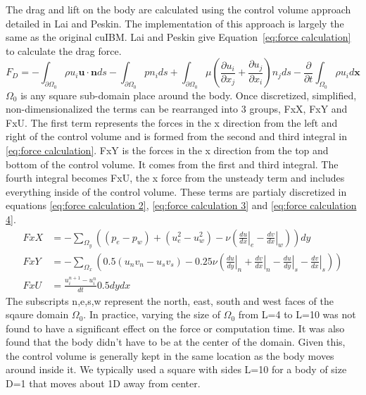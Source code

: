 The drag and lift on the body are calculated using the control volume approach detailed in Lai and Peskin\cite{lai2000immersed}.
The implementation of this approach is largely the same as the original cuIBM. 
Lai and Peskin give Equation~\eqref{eq:force calculation} to calculate the drag force. 
\begin{equation}\label{eq:force calculation}
F_D=-\int_{\partial \Omega_0} \rho u_i\textbf{u}\cdot \textbf{n}ds- \int_{\partial \Omega_0}pn_ids+\int_{\partial \Omega_0}\mu \left(\frac{\partial u_i}{\partial x_j}+\frac{\partial u_j}{\partial x_i}\right)n_jds-\frac{\partial}{\partial t}\int_{\Omega_0}\rho u_i d\textbf{x}
\end{equation}
$\Omega_0$ is any square sub-domain place around the body. 
Once discretized, simplified, non-dimensionalized the terms can be rearranged into 3 groups, FxX, FxY and FxU. 
The first term represents the forces in the x direction from the left and right of the control volume and is formed from the second and third integral in \eqref{eq:force calculation}. 
FxY is the forces in the x direction from the top and bottom of the control volume.
It comes from the first and third integral. 
The fourth integral becomes FxU, the x force from the unsteady term and includes everything inside of the control volume. 
These terms are partialy discretized in equations \eqref{eq:force calculation 2}, \eqref{eq:force calculation 3} and \eqref{eq:force calculation 4}. 
\begin{align}
FxX &=-\sum_{\Omega_y}\left((p_e-p_w)+(u_e^2-u_w^2)-\nu\left(\left.\frac{du}{dx}\right|_e-\left.\frac{dv}{dx}\right|_w\right)\right)dy\label{eq:force calculation 2}\\
FxY &=-\sum_{\Omega_x}\left(0.5(u_nv_n-u_sv_s)-0.25\nu \left(\left.\frac{du}{dy}\right|_n+\left.\frac{dv}{dx}\right|_n-\left.\frac{du}{dy}\right|_s-\left.\frac{dv}{dx}\right|_s\right)\right)\label{eq:force calculation 3}\\
FxU &=\frac{u_i^{n+1}-u_i^{n}}{dt}0.5dydx\;\label{eq:force calculation 4}
\end{align}
The subscripts n,e,s,w represent the north, east, south and west faces of the sqaure domain $\Omega_0$.
In practice, varying the size of $\Omega_0$ from L=4 to L=10 was not found to have a significant effect on the force or computation time.
It was also found that the body didn't have to be at the center of the domain.
Given this, the control volume is generally kept in the same location as the body moves around inside it.
We typically used a square with sides L=10 for a body of size D=1 that moves about 1D away from center.


